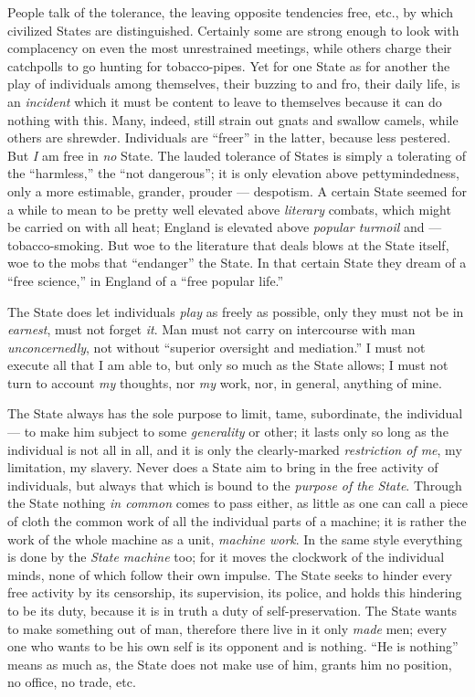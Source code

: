 People talk of the tolerance, the leaving opposite tendencies free, etc., by 
which civilized States are distinguished. Certainly some are strong enough to 
look with complacency on even the most unrestrained meetings, while others 
charge their catchpolls to go hunting for tobacco-pipes. Yet for one State as 
for another the play of individuals among themselves, their buzzing to and 
fro, their daily life, is an \textit{incident} which it must be content to 
leave to themselves because it can do nothing with this. Many, indeed, still 
strain out gnats and swallow camels, while others are shrewder. Individuals 
are ``freer'' in the latter, because less pestered. But \textit{I} am free 
in \textit{no} State. The lauded tolerance of States is simply a tolerating of 
the ``harmless,'' the ``not dangerous''; it is only elevation above 
pettymindedness, only a more estimable, grander, prouder --- despotism. A 
certain State seemed for a while to mean to be pretty well elevated above 
\textit{literary} combats, which might be carried on with all heat; England is 
elevated above \textit{popular turmoil} and --- tobacco-smoking. But woe to the 
literature that deals blows at the State itself, woe to the mobs that 
``endanger'' the State. In that certain State they dream of a ``free 
science,'' in England of a ``free popular life.''

The State does let individuals \textit{play} as freely as possible, only they 
must not be in \textit{earnest}, must not forget \textit{it}. Man must not 
carry on intercourse with man \textit{unconcernedly}, not without ``superior 
oversight and mediation.'' I must not execute all that I am able to, but only 
so much as the State allows; I must not turn to account \textit{my} thoughts, 
nor \textit{my} work, nor, in general, anything of mine.

The State always has the sole purpose to limit, tame, subordinate, the 
individual --- to make him subject to some \textit{generality} or other; it 
lasts only so long as the individual is not all in all, and it is only the 
clearly-marked \textit{restriction of me}, my limitation, my slavery. Never 
does a State aim to bring in the free activity of individuals, but always that 
which is bound to the \textit{purpose of the State}. Through the State nothing 
\textit{in common} comes to pass either, as little as one can call a piece of 
cloth the common work of all the individual parts of a machine; it is rather 
the work of the whole machine as a unit, \textit{machine work}. In the same 
style everything is done by the \textit{State machine} too; for it moves the 
clockwork of the individual minds, none of which follow their own impulse. The 
State seeks to hinder every free activity by its censorship, its supervision, 
its police, and holds this hindering to be its duty, because it is in truth a 
duty of self-preservation. The State wants to make something out of man, 
therefore there live in it only \textit{made} men; every one who wants to be 
his own self is its opponent and is nothing. ``He is nothing'' means as much 
as, the State does not make use of him, grants him no position, no office, no 
trade, etc.

